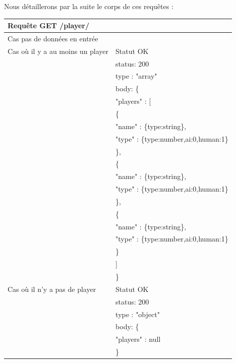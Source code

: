 \documentclass[12pt,a4paper]{article}
\begin{document}
Nous détaillerons par la suite le corps de ces requêtes : 


\begin{longtable}{ll}
   Requête GET /player/ &  \\
   \hline
   \hline
   Cas pas de données en entrée &  \\
   \hline
   Cas où il y a au moins un player & Statut OK\\
    & status: 200\\
    & type : "array"\\
    & body: \{ \\
    & \hspace{1cm}"players" : [\\
    &      \hspace{2cm}\{\\
    &          \hspace{3cm}"name" : \{type:string\},\\
    &          \hspace{3cm}"type" : \{type:number,ai:0,human:1\}\\
    &      \hspace{2cm}\},\\
    &      \hspace{2cm}\{\\
    &         \hspace{3cm}"name" : \{type:string\},\\
    &         \hspace{3cm}"type" : \{type:number,ai:0,human:1\}\\
    &      \hspace{2cm}\},\\
    &      \hspace{2cm}\{\\
    &         \hspace{3cm}"name" : \{type:string\},\\
    &         \hspace{3cm}"type" : \{type:number,ai:0,human:1\}\\
    &      \hspace{2cm}\}\\
    &   \hspace{1cm}]\\
    & \}\\
   \hline
    Cas où il n'y a pas de player & Statut OK\\
    & status: 200\\
    & type : "object"\\
    & body: \{ \\
    & \hspace{1cm}"players" : null\\
    & \}\\


\end{longtable}
\end{document}
